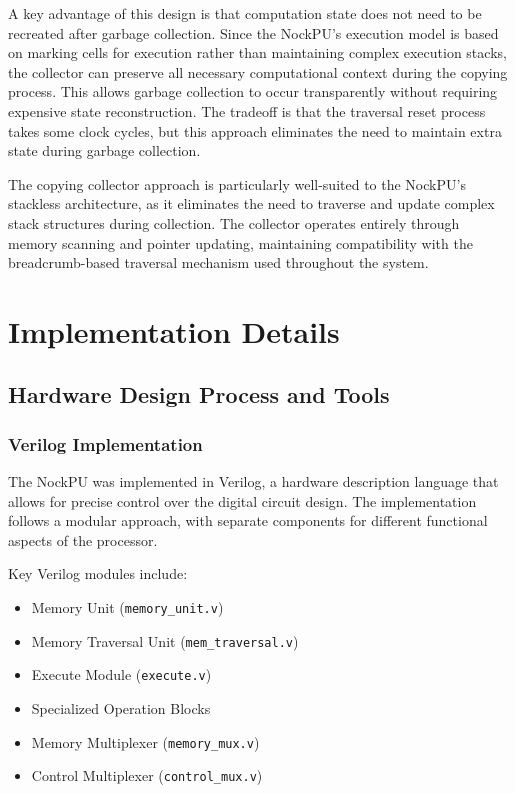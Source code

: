 \documentclass[twoside]{article}
\begin{document}
\noindent
A key advantage of this design is that computation state does not need to be recreated after garbage collection. Since the NockPU's execution model is based on marking cells for execution rather than maintaining complex execution stacks, the collector can preserve all necessary computational context during the copying process. This allows garbage collection to occur transparently without requiring expensive state reconstruction. The tradeoff is that the traversal reset process takes some clock cycles, but this approach eliminates the need to maintain extra state during garbage collection.

The copying collector approach is particularly well-suited to the NockPU's stackless architecture, as it eliminates the need to traverse and update complex stack structures during collection. The collector operates entirely through memory scanning and pointer updating, maintaining compatibility with the breadcrumb-based traversal mechanism used throughout the system.

\section{Implementation Details}

\subsection{Hardware Design Process and Tools}

\subsubsection{Verilog Implementation}

The NockPU was implemented in Verilog, a hardware description language that allows for precise control over the digital circuit design. The implementation follows a modular approach, with separate components for different functional aspects of the processor.

Key Verilog modules include:
\begin{itemize}
  \item Memory Unit (\texttt{memory\_unit.v})
  \item Memory Traversal Unit (\texttt{mem\_traversal.v})
  \item Execute Module (\texttt{execute.v})
  \item Specialized Operation Blocks
  \item Memory Multiplexer (\texttt{memory\_mux.v})
  \item Control Multiplexer (\texttt{control\_mux.v})
\end{itemize}
\end{document}
